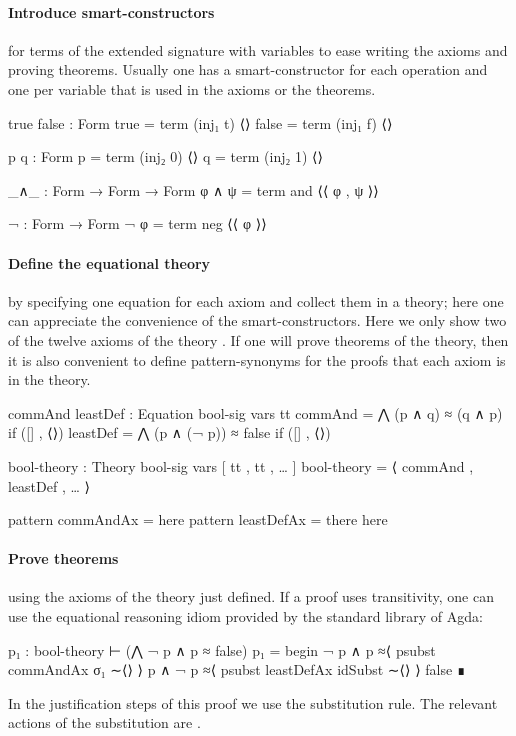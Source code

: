 \paragraph*{Introduce smart-constructors}
\label{sec:intr-smart-constr}
  for terms of the extended
  signature with variables to ease writing the axioms and proving
  theorems. Usually one has a smart-constructor for each operation and
  one per variable that is used in the axioms or the theorems.
\begin{spec}
true false : Form
true = term (inj₁ t) ⟨⟩
false = term (inj₁ f) ⟨⟩

p q  : Form
p = term (inj₂ 0) ⟨⟩
q = term (inj₂ 1) ⟨⟩

_∧_ : Form → Form → Form
φ ∧ ψ = term and ⟨⟨ φ , ψ ⟩⟩

¬ : Form → Form
¬ φ = term neg ⟨⟨ φ ⟩⟩
\end{spec}

\paragraph*{Define the equational theory}
\label{sec:define-equat-theory}

 by specifying one equation for
  each axiom and collect them in a theory; here one can appreciate the
  convenience of the smart-constructors. Here we only show two of the
  twelve axioms of the theory . If one will prove theorems
  of the theory, then it is also convenient to define pattern-synonyms
  for the proofs that each axiom is in the theory.
\begin{spec}
commAnd leastDef : Equation bool-sig vars tt
commAnd = ⋀ (p ∧ q) ≈ (q ∧ p) if ([] , ⟨⟩)
leastDef = ⋀ (p ∧ (¬ p)) ≈ false  if ([] , ⟨⟩)

bool-theory : Theory bool-sig vars [ tt , tt , … ]
bool-theory = ⟨ commAnd , leastDef , … ⟩

pattern commAndAx = here
pattern leastDefAx = there here
\end{spec}

\paragraph*{Prove theorems}
  using the axioms of the theory just defined.
  If a proof uses transitivity, one can use the equational reasoning
  idiom provided by the standard library of Agda:
\begin{spec}
  p₁ : bool-theory ⊢ (⋀ ¬ p ∧ p ≈ false)
  p₁ = begin
         ¬ p ∧ p
         ≈⟨ psubst commAndAx σ₁ ∼⟨⟩ ⟩
         p ∧ ¬ p
         ≈⟨ psubst leastDefAx idSubst ∼⟨⟩ ⟩
         false
       ∎
\end{spec}
\noindent In the justification steps of this proof we use the
substitution rule. The relevant actions of the substitution  are
.




